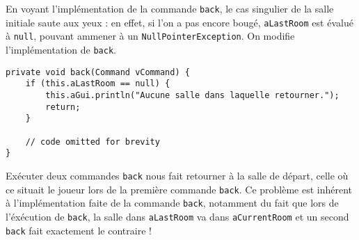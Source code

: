 \begin{exercise}[subtitle=back test]

En voyant l'implémentation de la commande \verb|back|, le cas singulier de la salle initiale saute aux yeux : en effet, si l'on a pas encore bougé, \verb|aLastRoom| est évalué à \verb|null|, pouvant ammener à un \verb|NullPointerException|. On modifie l'implémentation de \verb|back|.

\begin{verbatim}
private void back(Command vCommand) {
    if (this.aLastRoom == null) {
        this.aGui.println("Aucune salle dans laquelle retourner.");
        return;
    }
    
    // code omitted for brevity
}
\end{verbatim}
\end{exercise}

\begin{exercise}[subtitle=back back]

Exécuter deux commandes \verb|back| nous fait retourner à la salle de départ, celle où ce situait le joueur lors de la première commande \verb|back|. Ce problème est inhérent à l'implémentation faite de la commande \verb|back|, notamment du fait que lors de l'éxécution de \verb|back|, la salle dans \verb|aLastRoom| va dans \verb|aCurrentRoom| et un second \verb|back| fait exactement le contraire !

\end{exercise}
